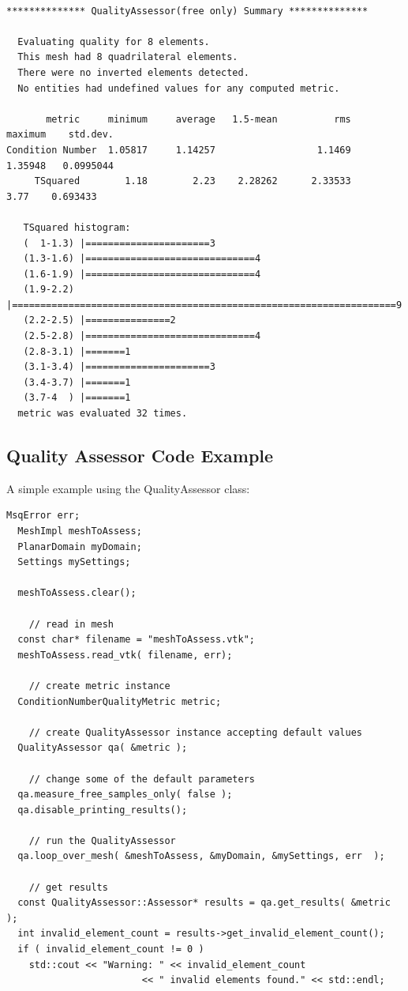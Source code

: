 \begin{verbatim}

************** QualityAssessor(free only) Summary **************

  Evaluating quality for 8 elements.
  This mesh had 8 quadrilateral elements.
  There were no inverted elements detected. 
  No entities had undefined values for any computed metric.

       metric     minimum     average   1.5-mean          rms     maximum    std.dev.
Condition Number  1.05817     1.14257                  1.1469     1.35948   0.0995044
     TSquared        1.18        2.23    2.28262      2.33533        3.77    0.693433

   TSquared histogram:
   (  1-1.3) |======================3
   (1.3-1.6) |==============================4
   (1.6-1.9) |==============================4
   (1.9-2.2) |====================================================================9
   (2.2-2.5) |===============2
   (2.5-2.8) |==============================4
   (2.8-3.1) |=======1
   (3.1-3.4) |======================3
   (3.4-3.7) |=======1
   (3.7-4  ) |=======1
  metric was evaluated 32 times.

\end{verbatim}

\clearpage
\subsection{Quality Assessor Code Example}

A simple example using the QualityAssessor class:

\begin{lstlisting}[frame=single]
  MsqError err;
  MeshImpl meshToAssess;
  PlanarDomain myDomain;
  Settings mySettings;

  meshToAssess.clear();

    // read in mesh
  const char* filename = "meshToAssess.vtk";
  meshToAssess.read_vtk( filename, err);

    // create metric instance
  ConditionNumberQualityMetric metric;

    // create QualityAssessor instance accepting default values
  QualityAssessor qa( &metric );

    // change some of the default parameters
  qa.measure_free_samples_only( false );
  qa.disable_printing_results();

    // run the QualityAssessor
  qa.loop_over_mesh( &meshToAssess, &myDomain, &mySettings, err  );

    // get results
  const QualityAssessor::Assessor* results = qa.get_results( &metric );
  int invalid_element_count = results->get_invalid_element_count();
  if ( invalid_element_count != 0 )
    std::cout << "Warning: " << invalid_element_count 
                        << " invalid elements found." << std::endl;
\end{lstlisting}

